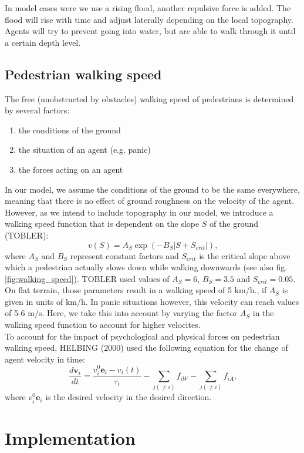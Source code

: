 \documentclass[11pt]{article}
\begin{document}
In model cases were we use a rising flood, another repulsive force is added. The flood will rise with time and adjust laterally depending on the local topography. Agents will try to prevent going into water, but are able to walk through it until a certain depth level.

\subsection{Pedestrian walking speed}
The free (unobstructed by obstacles) walking speed of pedestrians is determined by several factors:
\begin{enumerate}
\item the conditions of the ground
\item the situation of an agent (e.g. panic)
\item the forces acting on an agent
\end{enumerate}
In our model, we assume the conditions of the ground to be the same everywhere, meaning that there is no effect of ground roughness on the velocity of the agent. However, as we intend to include topography in our model, we introduce a walking speed function that is dependent on the slope $S$ of the ground (TOBLER):
\begin{equation}
	v(S) = A_{S} \exp{\left( -B_S | S + S_{crit} |  \right)}\mbox{,}
\end{equation}
where $A_S$ and $B_{S}$ represent constant factors and $S_{crit}$ is the critical slope above which a pedestrian actually slows down while walking downwards (see also fig.\ref{fig:walking_speed}). TOBLER used values of $A_S = 6$, $B_S = 3.5$ and $S_{crit} = 0.05$. On flat terrain, those parameters result in a walking speed of 5 km/h., if $A_S$ is given in units of km/h. In panic situations however, this velocity can reach values of 5-6 m/s. Here, we take this into account by varying the factor $A_S$ in the walking speed function to account for higher velocites.\\
To account for the impact of psychological and physical forces on pedestrian walking speed, HELBING (2000) used the following equation for the change of agent velocity in time:
\begin{equation}
	\frac{d \mathbf{v}_i}{dt} = \frac{v_i^0\mathbf{e}_i - v_i(t)}{\tau_i} - \sum_{j(\ne i)}f_{iW} - \sum_{j(\ne i)}f_{iA}\mbox{,}
\end{equation}
where $v_i^0\mathbf{e}_i$ is the desired velocity in the desired direction.


\section{Implementation}\label{sec:implementation}
\end{document}
